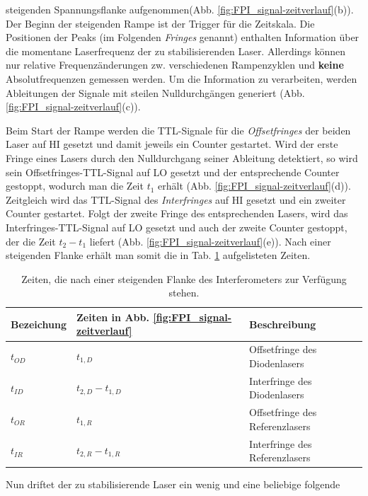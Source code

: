 steigenden Spannungsflanke aufgenommen(Abb.
\ref{fig:FPI_signal-zeitverlauf}(b)). Der Beginn der steigenden Rampe ist der
Trigger für die Zeitskala. Die Positionen der Peaks (im Folgenden
\textit{Fringes} genannt) enthalten Information über die momentane
Laserfrequenz der zu stabilisierenden Laser. Allerdings können nur relative Frequenzänderungen zw.
verschiedenen Rampenzyklen und \textbf{keine} Absolutfrequenzen gemessen
werden. Um die Information zu verarbeiten, werden Ableitungen der Signale mit
steilen Nulldurchgängen generiert (Abb.
\ref{fig:FPI_signal-zeitverlauf}(c)).\par
Beim Start der Rampe werden die TTL-Signale für die \textit{Offsetfringes} der
beiden Laser auf HI gesetzt und damit jeweils ein Counter gestartet. Wird der
erste Fringe eines Lasers durch den Nulldurchgang seiner Ableitung detektiert,
so wird sein Offsetfringes-TTL-Signal auf LO gesetzt und der entsprechende
Counter gestoppt, wodurch man die Zeit $t_1$ erhält (Abb.
\ref{fig:FPI_signal-zeitverlauf}(d)). Zeitgleich wird das TTL-Signal des
\textit{Interfringes} auf HI gesetzt und ein zweiter Counter gestartet.
Folgt der zweite Fringe des entsprechenden Lasers, wird das
Interfringes-TTL-Signal auf LO gesetzt und auch der zweite Counter gestoppt, der
die Zeit $t_2-t_1$ liefert (Abb. \ref{fig:FPI_signal-zeitverlauf}(e)). Nach
einer steigenden Flanke erhält man somit die in Tab. \ref{tab:laserzeiten}
aufgelisteten Zeiten.\par
\begin{table}
	\begin{tabular}{p{}p{}p{}}
		\toprule
		Bezeichung & Zeiten in Abb. \ref{fig:FPI_signal-zeitverlauf} & Beschreibung \\
		\midrule[1px]
		\hline
		$t_{OD}$ & $t_{1,D}$ & Offsetfringe des Diodenlasers \\
		$t_{ID}$ & $t_{2,D}-t_{1,D}$ & Interfringe des Diodenlasers \\
		$t_{OR}$ & $t_{1,R}$ & Offsetfringe des Referenzlasers \\
		$t_{IR}$ & $t_{2,R}-t_{1,R}$ & Interfringe des Referenzlasers \\
		\bottomrule[1px]
	\end{tabular}
	\caption{Zeiten, die nach einer steigenden Flanke des Interferometers zur
	Verfügung stehen.}
	\label{tab:laserzeiten}
\end{table}
Nun driftet der zu stabilisierende Laser ein wenig und eine beliebige folgende
